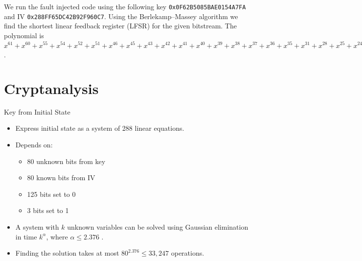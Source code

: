 \documentclass[conference]{IEEEtran}
\newcommand{\code}[1]{\texttt{#1}}
\begin{document}
We run the fault injected code using the following key \code{0x0F62B5085BAE0154A7FA} and IV \code{0x288FF65DC42B92F960C7}. Using the Berlekamp–Massey algorithm \cite{massey} we find the shortest linear feedback register (LFSR) for the given bitstream. The polynomial is
$x^{61} + x^{60} + x^{55} + x^{54} + x^{52} + x^{51} + x^{46} + x^{45} + x^{43} + x^{42} + x^{41} + x^{40} + x^{39} + x^{38} + x^{37} + x^{36} + x^{35} + x^{31} + x^{28} + x^{25} + x^{24} + x^{23} + x^{20} + x^{19} + x^{18} + x^{11} + x^8 + x^7 + 1$.


\section{Cryptanalysis}\label{sec:cryptanalysis}

Key from Initial State
\begin{itemize}
\item[$\blacktriangleright$] Express initial state as a system of 288 linear equations.
\item[$\blacktriangleright$] Depends on:
\begin{itemize}
\item[$\triangleright$] 80 unknown bits from key
\item[$\triangleright$] 80 known bits from IV
\item[$\triangleright$] 125 bits set to 0
\item[$\triangleright$] 3 bits set to 1
\end{itemize}
\item[$\blacktriangleright$] A system with $k$ unknown variables can be solved using Gaussian elimination in time $k^\alpha$, where $\alpha\leq 2.376$ \cite{gauss}.
\item[$\blacktriangleright$] Finding the solution takes at most $80^{2.376} \leq 33,247$ operations.
\end{itemize}
\end{document}
